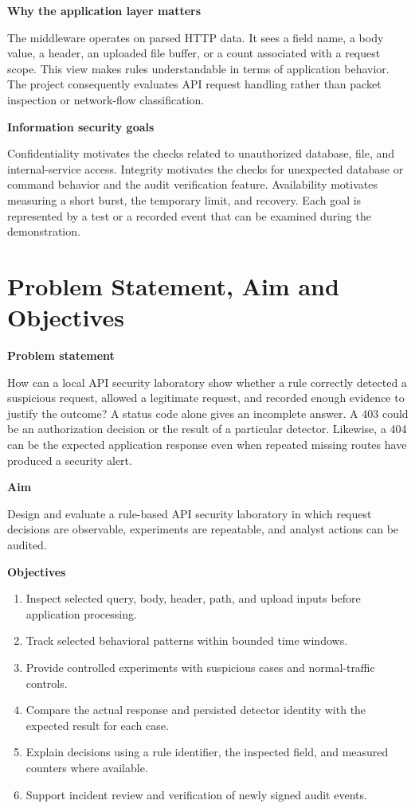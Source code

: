 \documentclass[11pt,a4paper,oneside]{report}
\newcommand{\topic}[1]{\smallskip\noindent\textbf{#1}\par\nobreak\vspace{-.39em}}
\newcommand{\sheet}[1]{\clearpage\section{#1}}
\begin{document}
\topic{Why the application layer matters}
The middleware operates on parsed HTTP data. It sees a field name, a body value, a header, an uploaded file buffer, or a count associated with a request scope. This view makes rules understandable in terms of application behavior. The project consequently evaluates API request handling rather than packet inspection or network-flow classification.

\topic{Information security goals}
Confidentiality motivates the checks related to unauthorized database, file, and internal-service access. Integrity motivates the checks for unexpected database or command behavior and the audit verification feature. Availability motivates measuring a short burst, the temporary limit, and recovery. Each goal is represented by a test or a recorded event that can be examined during the demonstration.

\sheet{Problem Statement, Aim and Objectives}
\topic{Problem statement}
How can a local API security laboratory show whether a rule correctly detected a suspicious request, allowed a legitimate request, and recorded enough evidence to justify the outcome? A status code alone gives an incomplete answer. A 403 could be an authorization decision or the result of a particular detector. Likewise, a 404 can be the expected application response even when repeated missing routes have produced a security alert.

\topic{Aim}
Design and evaluate a rule-based API security laboratory in which request decisions are observable, experiments are repeatable, and analyst actions can be audited.

\topic{Objectives}
\begin{enumerate}
\item Inspect selected query, body, header, path, and upload inputs before application processing.
\item Track selected behavioral patterns within bounded time windows.
\item Provide controlled experiments with suspicious cases and normal-traffic controls.
\item Compare the actual response and persisted detector identity with the expected result for each case.
\item Explain decisions using a rule identifier, the inspected field, and measured counters where available.
\item Support incident review and verification of newly signed audit events.
\end{enumerate}
\end{document}

